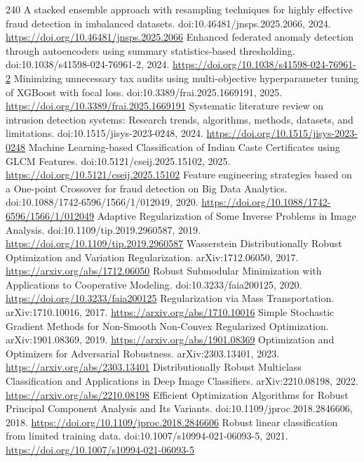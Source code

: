 \documentclass[11pt]{article}
\begin{document}
\begin{thebibliography}{240}
 A stacked ensemble approach with resampling techniques for highly effective fraud detection in imbalanced datasets. doi:10.46481/jnsps.2025.2066, 2024. \url{https://doi.org/10.46481/jnsps.2025.2066}
 Enhanced federated anomaly detection through autoencoders using summary statistics-based thresholding. doi:10.1038/s41598-024-76961-2, 2024. \url{https://doi.org/10.1038/s41598-024-76961-2}
 Minimizing unnecessary tax audits using multi-objective hyperparameter tuning of XGBoost with focal loss. doi:10.3389/frai.2025.1669191, 2025. \url{https://doi.org/10.3389/frai.2025.1669191}
 Systematic literature review on intrusion detection systems: Research trends, algorithms, methods, datasets, and limitations. doi:10.1515/jisys-2023-0248, 2024. \url{https://doi.org/10.1515/jisys-2023-0248}
 Machine Learning-based Classification of Indian Caste Certificates using GLCM Features. doi:10.5121/cseij.2025.15102, 2025. \url{https://doi.org/10.5121/cseij.2025.15102}
 Feature engineering strategies based on a One-point Crossover for fraud detection on Big Data Analytics. doi:10.1088/1742-6596/1566/1/012049, 2020. \url{https://doi.org/10.1088/1742-6596/1566/1/012049}
 Adaptive Regularization of Some Inverse Problems in Image Analysis. doi:10.1109/tip.2019.2960587, 2019. \url{https://doi.org/10.1109/tip.2019.2960587}
 Wasserstein Distributionally Robust Optimization and Variation Regularization. arXiv:1712.06050, 2017. \url{https://arxiv.org/abs/1712.06050}
 Robust Submodular Minimization with Applications to Cooperative Modeling. doi:10.3233/faia200125, 2020. \url{https://doi.org/10.3233/faia200125}
 Regularization via Mass Transportation. arXiv:1710.10016, 2017. \url{https://arxiv.org/abs/1710.10016}
 Simple Stochastic Gradient Methods for Non-Smooth Non-Convex Regularized Optimization. arXiv:1901.08369, 2019. \url{https://arxiv.org/abs/1901.08369}
 Optimization and Optimizers for Adversarial Robustness. arXiv:2303.13401, 2023. \url{https://arxiv.org/abs/2303.13401}
 Distributionally Robust Multiclass Classification and Applications in Deep Image Classifiers. arXiv:2210.08198, 2022. \url{https://arxiv.org/abs/2210.08198}
 Efficient Optimization Algorithms for Robust Principal Component Analysis and Its Variants. doi:10.1109/jproc.2018.2846606, 2018. \url{https://doi.org/10.1109/jproc.2018.2846606}
 Robust linear classification from limited training data. doi:10.1007/s10994-021-06093-5, 2021. \url{https://doi.org/10.1007/s10994-021-06093-5}

\end{thebibliography}
\end{document}
